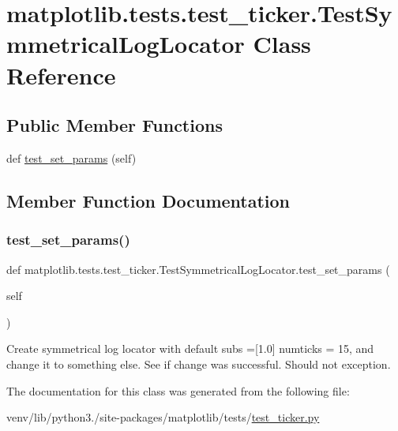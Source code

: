 \hypertarget{classmatplotlib_1_1tests_1_1test__ticker_1_1TestSymmetricalLogLocator}{}\section{matplotlib.\+tests.\+test\+\_\+ticker.\+Test\+Symmetrical\+Log\+Locator Class Reference}
\label{classmatplotlib_1_1tests_1_1test__ticker_1_1TestSymmetricalLogLocator}
\subsection*{Public Member Functions}
\begin{DoxyCompactItemize}
\item 
def \hyperlink{classmatplotlib_1_1tests_1_1test__ticker_1_1TestSymmetricalLogLocator_a86babd2267222f095c6c69b6d8575f2c}{test\+\_\+set\+\_\+params} (self)
\end{DoxyCompactItemize}


\subsection{Member Function Documentation}
\mbox{\label{classmatplotlib_1_1tests_1_1test__ticker_1_1TestSymmetricalLogLocator_a86babd2267222f095c6c69b6d8575f2c}} 
\subsubsection{\texorpdfstring{test\+\_\+set\+\_\+params()}{test\_set\_params()}}
{\footnotesize\ttfamily def matplotlib.\+tests.\+test\+\_\+ticker.\+Test\+Symmetrical\+Log\+Locator.\+test\+\_\+set\+\_\+params (\begin{DoxyParamCaption}\item[{}]{self }\end{DoxyParamCaption})}

\begin{DoxyVerb}Create symmetrical log locator with default subs =[1.0] numticks = 15,
and change it to something else.
See if change was successful.
Should not exception.
\end{DoxyVerb}
 

The documentation for this class was generated from the following file\+:\begin{DoxyCompactItemize}
\item 
venv/lib/python3./site-\/packages/matplotlib/tests/\hyperlink{test__ticker_8py}{test\+\_\+ticker.\+py}\end{DoxyCompactItemize}
